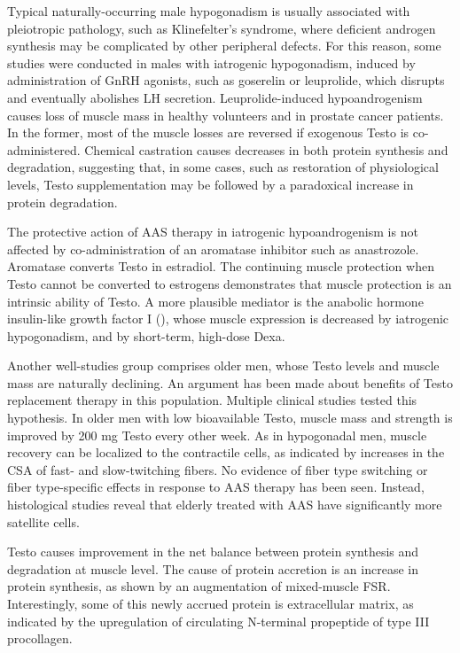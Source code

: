 \documentclass[12pt,english]{report}\usepackage[]{graphicx}\usepackage[]{color}
\begin{document}
Typical naturally-occurring male hypogonadism is usually associated
with pleiotropic pathology, such as Klinefelter's syndrome, where
deficient androgen synthesis may be complicated by other peripheral
defects. For this reason, some studies were conducted in males with
iatrogenic hypogonadism, induced by administration of GnRH agonists,
such as goserelin or leuprolide, which disrupts and eventually abolishes
LH secretion. Leuprolide-induced hypoandrogenism causes loss of muscle
mass in healthy volunteers and in prostate cancer patients\citep{smith2002changes,boxer2005effect}.
In the former, most of the muscle losses are reversed if exogenous
Testo is co-administered. Chemical castration causes decreases in
both protein synthesis and degradation\citep{mauras1998testosterone},
suggesting that, in some cases, such as restoration of physiological
levels, Testo supplementation may be followed by a paradoxical increase
in protein degradation.

The protective action of AAS therapy in iatrogenic hypoandrogenism
is not affected by co-administration of an aromatase inhibitor such
as anastrozole\citep{finkelstein2013gonadal}. Aromatase converts
Testo in estradiol. The continuing muscle protection when Testo cannot
be converted to estrogens demonstrates that muscle protection is an
intrinsic ability of Testo. A more plausible mediator is the anabolic
hormone insulin-like growth factor I (),
whose muscle expression is decreased by iatrogenic hypogonadism\citep{mauras1998testosterone},
and by short-term, high-dose Dexa.

Another well-studies group comprises older men, whose Testo levels
and muscle mass are naturally declining\citep{rosenberg1989summary,feldman2002age}.
An argument has been made about benefits of Testo replacement therapy
in this population. Multiple clinical studies tested this hypothesis.
In older men with low bioavailable Testo, muscle mass and strength
is improved by 200 mg Testo every other week\citep{morley1993effects,sih1997testosterone}.
As in hypogonadal men, muscle recovery can be localized to the contractile
cells, as indicated by increases in the CSA of fast- and slow-twitching
fibers\citep{sinha-hikim2006effects}. No evidence of fiber type switching
or fiber type-specific effects in response to AAS therapy has been
seen. Instead, histological studies reveal that elderly treated with
AAS have significantly more satellite cells\citep{sinha-hikim2006effects}. 

Testo causes improvement in the net balance between protein synthesis
and degradation at muscle level\citep{ferrando2002testosterone}.
The cause of protein accretion is an increase in protein synthesis,
as shown by an augmentation of mixed-muscle FSR\citep{sheffield-moore2011randomized}.
Interestingly, some of this newly accrued protein is extracellular
matrix, as indicated by the upregulation of circulating N-terminal
propeptide of type III procollagen\citep{bhasin2009n-terminal}.
\end{document}
